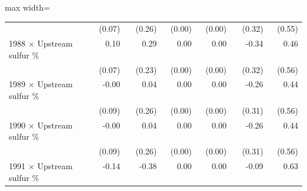 \begin{table}[htbp]
{\begin{adjustbox}{max width=\linewidth}
\begin{tabular}{lrrrrrr}
 & (\phantom{-}0.07)\phantom{$^{***}$} & (\phantom{-}0.26)\phantom{$^{***}$} & (\phantom{-}0.00)\phantom{$^{***}$} & (\phantom{-}0.00)\phantom{$^{***}$} & (\phantom{-}0.32)\phantom{$^{***}$} & (\phantom{-}0.55)\phantom{$^{***}$} \\
1988 $\times$ Upstream sulfur \% & \phantom{(}\phantom{-}0.10$^{\phantom{*}\phantom{*}\phantom{*}}$ & \phantom{(}\phantom{-}0.29$^{\phantom{*}\phantom{*}\phantom{*}}$ & \phantom{(}\phantom{-}0.00$^{\phantom{*}\phantom{*}\phantom{*}}$ & \phantom{(}\phantom{-}0.00$^{\phantom{*}\phantom{*}\phantom{*}}$ & \phantom{(}-0.34$^{\phantom{*}\phantom{*}\phantom{*}}$ & \phantom{(}\phantom{-}0.46$^{\phantom{*}\phantom{*}\phantom{*}}$ \\
 & (\phantom{-}0.07)\phantom{$^{***}$} & (\phantom{-}0.23)\phantom{$^{***}$} & (\phantom{-}0.00)\phantom{$^{***}$} & (\phantom{-}0.00)\phantom{$^{***}$} & (\phantom{-}0.32)\phantom{$^{***}$} & (\phantom{-}0.56)\phantom{$^{***}$} \\
1989 $\times$ Upstream sulfur \% & \phantom{(}-0.00$^{\phantom{*}\phantom{*}\phantom{*}}$ & \phantom{(}\phantom{-}0.04$^{\phantom{*}\phantom{*}\phantom{*}}$ & \phantom{(}\phantom{-}0.00$^{\phantom{*}\phantom{*}\phantom{*}}$ & \phantom{(}\phantom{-}0.00$^{\phantom{*}\phantom{*}\phantom{*}}$ & \phantom{(}-0.26$^{\phantom{*}\phantom{*}\phantom{*}}$ & \phantom{(}\phantom{-}0.44$^{\phantom{*}\phantom{*}\phantom{*}}$ \\
 & (\phantom{-}0.09)\phantom{$^{***}$} & (\phantom{-}0.26)\phantom{$^{***}$} & (\phantom{-}0.00)\phantom{$^{***}$} & (\phantom{-}0.00)\phantom{$^{***}$} & (\phantom{-}0.31)\phantom{$^{***}$} & (\phantom{-}0.56)\phantom{$^{***}$} \\
1990 $\times$ Upstream sulfur \% & \phantom{(}-0.00$^{\phantom{*}\phantom{*}\phantom{*}}$ & \phantom{(}\phantom{-}0.04$^{\phantom{*}\phantom{*}\phantom{*}}$ & \phantom{(}\phantom{-}0.00$^{\phantom{*}\phantom{*}\phantom{*}}$ & \phantom{(}\phantom{-}0.00$^{\phantom{*}\phantom{*}\phantom{*}}$ & \phantom{(}-0.26$^{\phantom{*}\phantom{*}\phantom{*}}$ & \phantom{(}\phantom{-}0.44$^{\phantom{*}\phantom{*}\phantom{*}}$ \\
 & (\phantom{-}0.09)\phantom{$^{***}$} & (\phantom{-}0.26)\phantom{$^{***}$} & (\phantom{-}0.00)\phantom{$^{***}$} & (\phantom{-}0.00)\phantom{$^{***}$} & (\phantom{-}0.31)\phantom{$^{***}$} & (\phantom{-}0.56)\phantom{$^{***}$} \\
1991 $\times$ Upstream sulfur \% & \phantom{(}-0.14$^{\phantom{*}\phantom{*}\phantom{*}}$ & \phantom{(}-0.38$^{\phantom{*}\phantom{*}\phantom{*}}$ & \phantom{(}\phantom{-}0.00$^{\phantom{*}\phantom{*}\phantom{*}}$ & \phantom{(}\phantom{-}0.00$^{\phantom{*}\phantom{*}\phantom{*}}$ & \phantom{(}-0.09$^{\phantom{*}\phantom{*}\phantom{*}}$ & \phantom{(}\phantom{-}0.63$^{\phantom{*}\phantom{*}\phantom{*}}$ \\

\end{tabular}
\end{adjustbox}}
\end{table}
